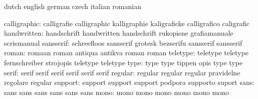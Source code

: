 \stopconstants




\startvariables            dutch                     english
                           german                    czech
                           italian                   romanian

             calligraphic: calligrafie               calligraphic
                           kalligraphie              kaligraficke
                           calligrafico              caligrafic
              handwritten: handschrift               handwritten
                           handschrift               rukopisne
                           grafiamanuale             scrismanual
                sansserif: schreefloos               sansserif
                           grotesk                   bezserifu
                           sansserif                 sansserif %
                    roman: romaan                    roman
                           antiqua                   antikva
                           roman                     roman %
                 teletype: teletype                  teletype
                           fernschreiber             strojopis
                           teletype                  teletype %
                     type: type                      type
                           tippen                    opis
                           type                      type %
                    serif: serif                     serif
                           serif                     serif
                           serif                     serif %
                  regular: regular                   regular
                           regular                   pravidelne
                           regolare                  regular
                  support: support                   support
                           support                   podpora
                           supporto                  suport
                     sans: sans                      sans
                           sans                      sans
                           sans                      sans
                     mono: mono                      mono
                           mono                      mono
                           mono                      mono

